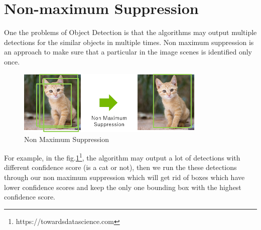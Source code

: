 \section{Non-maximum Suppression}
\hspace{0.45cm}One the problems of Object Detection is that the algorithms may output multiple detections for the similar objects in multiple times. Non maximum suppression is an approach to make sure that a particular in the image scenes is identified only once.
\begin{figure}[h!]
    \centering
    \includegraphics[width=0.8\textwidth]{Chapters/Fig/nms.png}
    \caption{Non Maximum Suppression}
    \label{fig:nms}
\end{figure}\par
For example, in the fig.\ref{fig:nms}\footnote{https://towardsdatascience.com}, the algorithm may output a lot of detections with different confidence score (is a cat or not), then we run the these detections through our non maximum suppression which will get rid of boxes which have lower confidence scores and keep the only one bounding box with the highest confidence score.
